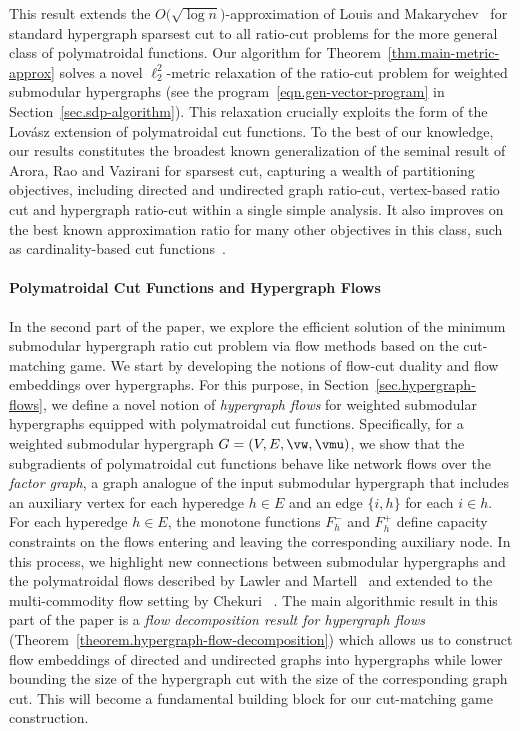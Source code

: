 \documentclass[letterpaper]{article}
\begin{document}
This result  extends the $O\big( \sqrt{\log n} \big)$-approximation of Louis and Makarychev~\cite{louis2016approximation} for standard hypergraph sparsest cut to all ratio-cut problems for the more general class of polymatroidal functions.
Our algorithm for Theorem~\ref{thm.main-metric-approx} solves a novel $\ell_2^2$-metric relaxation of the ratio-cut problem for weighted submodular hypergraphs (see the program~\ref{eqn.gen-vector-program} in Section~\ref{sec.sdp-algorithm}). This relaxation crucially exploits the form of the Lov\'asz extension of polymatroidal cut functions.
To the best of our knowledge, our results constitutes the broadest known generalization of the seminal result of Arora, Rao and Vazirani for sparsest cut, capturing a wealth of partitioning objectives, including directed and undirected graph ratio-cut, vertex-based ratio cut and hypergraph ratio-cut within a single simple analysis. It also improves on the best known approximation ratio for many other objectives in this class, such as cardinality-based cut functions~\cite{veldt2021approximate}.


\paragraph{Polymatroidal Cut Functions and Hypergraph Flows}
In the second part of the paper, we explore the efficient solution of the minimum submodular hypergraph ratio cut problem via flow methods based on the cut-matching game. We start by developing the notions of flow-cut duality and flow embeddings over hypergraphs. For this purpose, in Section~\ref{sec.hypergraph-flows}, we define a novel notion of \emph{hypergraph flows} for weighted submodular hypergraphs equipped with polymatroidal cut functions.
Specifically, for a weighted submodular hypergraph $G=(V,E, \vw, \vmu)$, we show that the subgradients of polymatroidal cut functions behave like network flows over the \emph{factor graph}, a graph analogue of the input submodular hypergraph that includes an auxiliary vertex for each hyperedge $h \in E$ and an edge $\{i,h\}$ for each $i \in h.$ For each hyperedge $h \in E$, the monotone functions $F_h^-$ and $F_h^+$ define capacity constraints on the flows entering and leaving the corresponding auxiliary node. In this process, we highlight new connections between submodular hypergraphs and the polymatroidal flows described by Lawler and Martell~\cite{lawler1982computing} and extended to the multi-commodity flow setting by Chekuri \etal~\cite{chekuri2012multicommodity}. The main algorithmic result in this part of the paper is a \emph{flow decomposition result for hypergraph flows} (Theorem~\ref{theorem.hypergraph-flow-decomposition}) which allows us to construct flow embeddings of directed and undirected graphs into hypergraphs while lower bounding the size of the hypergraph cut with the size of the corresponding graph cut. This will become a fundamental building block for our cut-matching game construction.
\end{document}
